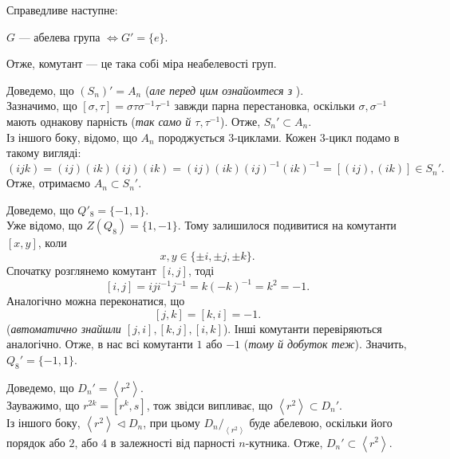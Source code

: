 \documentclass{math_library}
\begin{document}
\begin{remark}
Справедливе наступне:
\begin{center}
$G$ --- абелева група $\iff G' = \{e\}$.
\end{center}
Отже, комутант --- це така собі міра неабелевості груп.
\end{remark}

\begin{example}
Доведемо, що $(S_n)' = A_n$ (\textit{але перед цим ознайомтеся з }).
\bigskip \\
Зазначимо, що $[\sigma,\tau] = \sigma \tau \sigma^{-1} \tau^{-1}$ завжди парна перестановка, оскільки $\sigma, \sigma^{-1}$ мають однакову парність (\textit{так само й $\tau, \tau^{-1}$}). Отже, $S_n' \subset A_n$.\\
Із іншого боку, відомо, що $A_n$ породжується $3$-циклами. Кожен $3$-цикл подамо в такому вигляді:
\[
(ijk) = (ij)(ik)(ij)(ik) = (ij)(ik)(ij)^{-1}(ik)^{-1} = [(ij),(ik)] \in S_n'.
\]
Отже, отримаємо $A_n \subset S_n'$.
\end{example}

\begin{example}
Доведемо, що $Q'_8 = \{-1,1\}$.
\bigskip \\
Уже відомо, що $Z(Q_8) = \{1,-1\}$. Тому залишилося подивитися на комутанти $[x,y]$, коли 
\[
x,y \in \{\pm i, \pm j, \pm k\}.
\]
Спочатку розглянемо комутант $[i,j]$, тоді
\[
[i,j] = iji^{-1}j^{-1} = k (-k)^{-1} = k^2 = -1.
\]
Аналогічно можна переконатися, що 
\[
[j,k] = [k,i] = -1.
\]
(\textit{автоматично знайшли $[j,i], [k,j], [i,k]$}). Інші комутанти перевіряються аналогічно. Отже, в нас всі комутанти $1$ або $-1$ (\textit{тому й добуток теж}). Значить, $Q_8' = \{-1,1\}$.
\end{example}

\begin{example}
Доведемо, що $D_n' = \left<r^2\right>$.
\bigskip \\
Зауважимо, що $r^{2k} = [r^k,s]$, тож звідси випливає, що $\left<r^2\right> \subset D_n'$.\\
Із іншого боку, $\left< r^2 \right> \triangleleft D_n$, при цьому $D_n/_{\left<r^2\right>}$ буде абелевою, оскільки його порядок або $2$, або $4$ в залежності від парності $n$-кутника. Отже, $D_n' \subset \left< r^2 \right>$.
\end{example}
\end{document}
